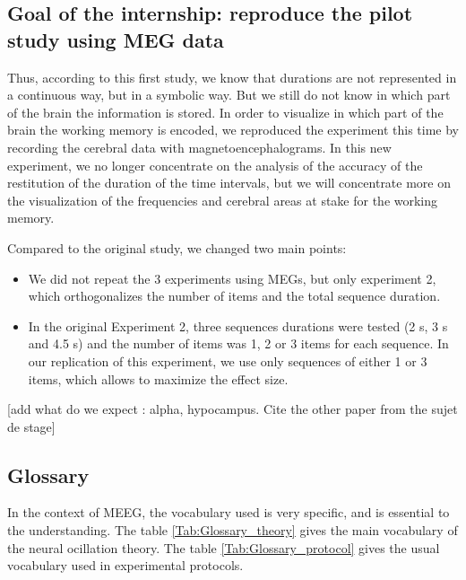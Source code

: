 \subsection{Goal of the internship: reproduce the pilot study using MEG data}

Thus, according to this first study, we know that durations are not represented in a continuous way, but in a symbolic way. But we still do not know in which part of the brain the information is stored. In order to visualize in which part of the brain the working memory is encoded, we reproduced the experiment this time by recording the cerebral data with magnetoencephalograms. In this new experiment, we no longer concentrate on the analysis of the accuracy of the restitution of the duration of the time intervals, but we will concentrate more on the visualization of the frequencies and cerebral areas at stake for the working memory.

Compared to the original study, we changed two main points:

\begin{itemize}
    \item We did not repeat the 3 experiments using MEGs, but only experiment 2, which orthogonalizes the number of items and the total sequence duration.
    \item In the original Experiment 2, three sequences durations were tested (2 s, 3 s and 4.5 s) and the number of items was 1, 2 or 3 items for each sequence. In our replication of this experiment, we use only sequences of either 1 or 3 items, which allows to maximize the effect size.
\end{itemize}

[add what do we expect : alpha, hypocampus. Cite the other paper from the sujet de stage]



\subsection{Glossary}

In the context of MEEG, the vocabulary used is very specific, and is essential to the understanding. The table \ref{Tab:Glossary_theory} gives the main vocabulary of the neural ocillation theory. The table \ref{Tab:Glossary_protocol} gives the usual vocabulary used in experimental protocols.

